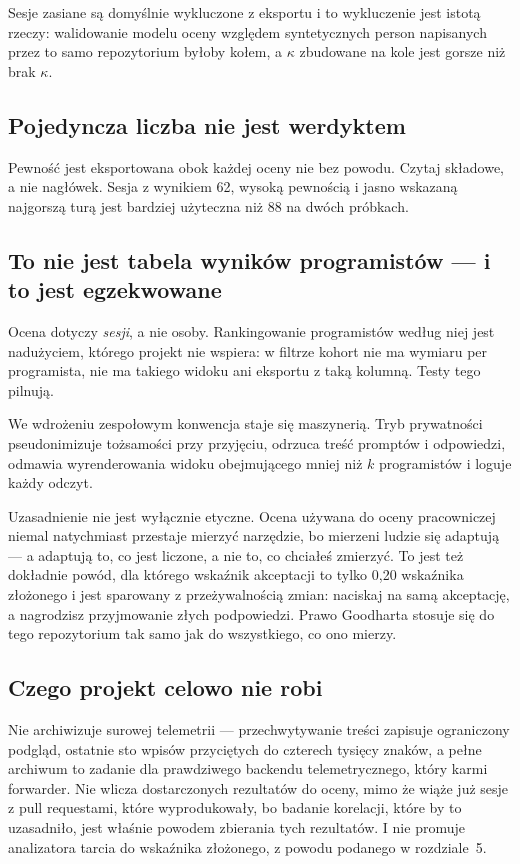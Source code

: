 \documentclass[11pt,a4paper]{article}
\begin{document}
Sesje zasiane są domyślnie wykluczone z eksportu i to wykluczenie jest istotą
rzeczy: walidowanie modelu oceny względem syntetycznych person napisanych przez
to samo repozytorium byłoby kołem, a $\kappa$ zbudowane na kole jest gorsze niż
brak $\kappa$.

\subsection{Pojedyncza liczba nie jest werdyktem}

Pewność jest eksportowana obok każdej oceny nie bez powodu. Czytaj składowe, a
nie nagłówek. Sesja z wynikiem 62, wysoką pewnością i jasno wskazaną najgorszą
turą jest bardziej użyteczna niż 88 na dwóch próbkach.

\subsection{To nie jest tabela wyników programistów --- i to jest egzekwowane}

Ocena dotyczy \emph{sesji}, a nie osoby. Rankingowanie programistów według niej
jest nadużyciem, którego projekt nie wspiera: w filtrze kohort nie ma wymiaru
per programista, nie ma takiego widoku ani eksportu z taką kolumną. Testy tego
pilnują.

We wdrożeniu zespołowym konwencja staje się maszynerią. Tryb prywatności
pseudonimizuje tożsamości przy przyjęciu, odrzuca treść promptów i odpowiedzi,
odmawia wyrenderowania widoku obejmującego mniej niż $k$ programistów i loguje
każdy odczyt.

Uzasadnienie nie jest wyłącznie etyczne. Ocena używana do oceny pracowniczej
niemal natychmiast przestaje mierzyć narzędzie, bo mierzeni ludzie się
adaptują --- a adaptują to, co jest liczone, a nie to, co chciałeś zmierzyć. To
jest też dokładnie powód, dla którego wskaźnik akceptacji to tylko 0,20
wskaźnika złożonego i jest sparowany z przeżywalnością zmian: naciskaj na samą
akceptację, a nagrodzisz przyjmowanie złych podpowiedzi. Prawo Goodharta stosuje
się do tego repozytorium tak samo jak do wszystkiego, co ono mierzy.

\subsection{Czego projekt celowo nie robi}

Nie archiwizuje surowej telemetrii --- przechwytywanie treści zapisuje
ograniczony podgląd, ostatnie sto wpisów przyciętych do czterech tysięcy znaków,
a pełne archiwum to zadanie dla prawdziwego backendu telemetrycznego, który
karmi forwarder. Nie wlicza dostarczonych rezultatów do oceny, mimo że wiąże już
sesje z pull requestami, które wyprodukowały, bo badanie korelacji, które by to
uzasadniło, jest właśnie powodem zbierania tych rezultatów. I nie promuje
analizatora tarcia do wskaźnika złożonego, z powodu podanego w rozdziale~5.
\end{document}
